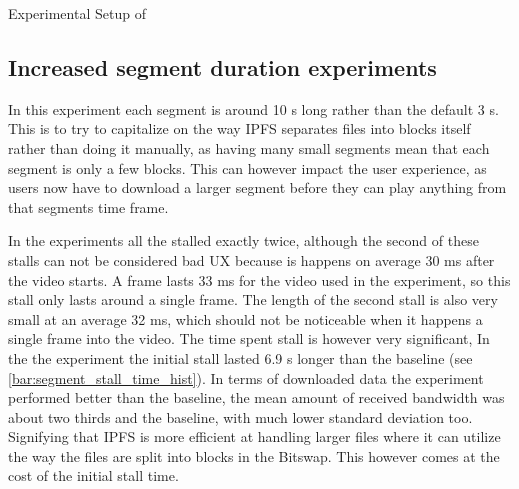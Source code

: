 \begin{table}[!htbp]
    \myfloatalign
    \caption[Experimental Setup of Segment size]{Experimental Setup of }
    \label{tab:exp_overview_video}
    
\end{table}

\subsection{Increased segment duration experiments}
\label{sec:eval_segment}

In this experiment each segment is around 10 \ac{s} long rather than the default 3 \ac{s}. This is to try to capitalize on the way \ac{IPFS} separates files into blocks itself rather than doing it manually, as having many small segments mean that each segment is only a few blocks. This can however impact the user experience, as users now have to download a larger segment before they can play anything from that segments time frame.

In the experiments all the stalled exactly twice, although the second of these stalls can not be considered bad \ac{UX} because is happens on average 30 \ac{ms} after the video starts. A frame lasts 33 \ac{ms} for the video used in the experiment, so this stall only lasts around a single frame. The length of the second stall is also very small at an average 32 \ac{ms}, which should not be noticeable when it happens a single frame into the video. The time spent stall is however very significant, In the the experiment the initial stall lasted 6.9 \ac{s} longer than the baseline (see \autoref{bar:segment_stall_time_hist}). In terms of downloaded data the experiment performed better than the baseline, the mean amount of received bandwidth was about two thirds and the baseline, with much lower standard deviation too. Signifying that \ac{IPFS} is more efficient at handling larger files where it can utilize the way the files are split into blocks in the Bitswap. This however comes at the cost of the initial stall time.

\if{}


\fi

